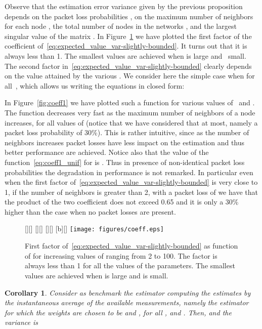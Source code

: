 \documentclass[a4paper,notitlepage,onecolumn]{article}
\newtheorem{corollary}[theorem]{Corollary}
\numberwithin{equation}{section}
\begin{document}
Observe that the estimation error variance given by the previous
proposition depends on the packet loss probabilities , on
the maximum number of neighbors for each node ,
the total number of nodes in the networks , and the largest
singular value of the matrix . In
Figure~\ref{fig:e_phi_e_v_q} we have plotted the first factor of
the coefficient of~\eqref{eq:expected_value_var-slightly-bounded}.
It turns out that it is always less than 1. The smallest values
are achieved when  is large and~ small. The
second factor in~\eqref{eq:expected_value_var-slightly-bounded}
clearly depends on the value attained by the various . We
consider here the simple case when  for all~, which
allows us writing the equations in closed form:

In Figure~\ref{fig:coeff1} we have plotted such a function for
various values of~ and . The function
decreases very fast as the maximum number of neighbors of a node
increases, for all values of  (notice that we have considered
that  at most, namely a packet loss probability of 30\%).
This is rather intuitive, since as the number of neighbors
increases packet losses have less impact on the estimation and
thus better performance are achieved. Notice also that the value
of the function~\eqref{eq:coeff1_unif} for  is
. Thus in presence of non-identical packet
loss probabilities the degradation in performance is not remarked.
In particular even when the first factor
of~\eqref{eq:expected_value_var-slightly-bounded} is very close to
1, if the number of neighbors is greater than 2, with a packet
loss of  we have that the product of the two coefficient
does not exceed 0.65 and it is only a 30\% higher than the case
when no packet losses are present.
\begin{figure}
    \centering
    [][]{}
    [][]{}
    [][]{}
    [b][]{}
    \texttt{[image: figures/coeff.eps]}
\caption{First factor of~\eqref{eq:expected_value_var-slightly-bounded} as function of  for increasing values of  ranging from 2 to 100.
    The factor is always less than 1 for all the values of the parameters. The smallest values are achieved when  is large and  is small.
}\label{fig:e_phi_e_v_q}
\end{figure}
\begin{corollary} \label{cor:benchest}
Consider as benchmark the estimator computing the estimates by the
instantaneous average of the available measurements, namely the
estimator for which the weights are chosen to be  and
, for all ,
and . Then,  and the variance is

\end{corollary}
\end{document}
